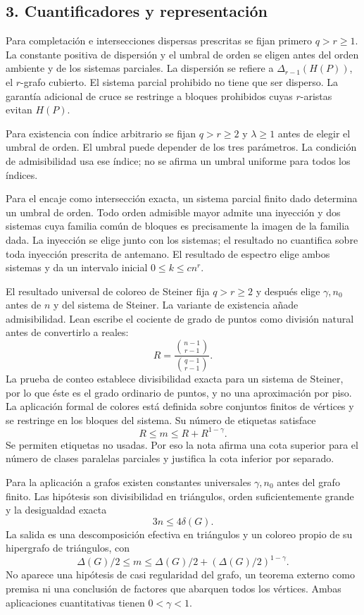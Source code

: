 \documentclass[spanish,11pt,a4paper]{article}
\begin{document}
\subsection{3. Cuantificadores y representación}\label{cuantificadores-y-representaciuxf3n}

Para completación e intersecciones dispersas prescritas se fijan primero \(q>r\ge1\). La constante positiva de dispersión y el umbral de orden se eligen antes del orden ambiente y de los sistemas parciales. La dispersión se refiere a \(\Delta_{r-1}(H(P))\), el \(r\)-grafo cubierto. El sistema parcial prohibido no tiene que ser disperso. La garantía adicional de cruce se restringe a bloques prohibidos cuyas \(r\)-aristas evitan \(H(P)\).

Para existencia con índice arbitrario se fijan \(q>r\ge2\) y \(\lambda\ge1\) antes de elegir el umbral de orden. El umbral puede depender de los tres parámetros. La condición de admisibilidad usa ese índice; no se afirma un umbral uniforme para todos los índices.

Para el encaje como intersección exacta, un sistema parcial finito dado determina un umbral de orden. Todo orden admisible mayor admite una inyección y dos sistemas cuya familia común de bloques es precisamente la imagen de la familia dada. La inyección se elige junto con los sistemas; el resultado no cuantifica sobre toda inyección prescrita de antemano. El resultado de espectro elige ambos sistemas y da un intervalo inicial \(0\le k\le c n^r\).

El resultado universal de coloreo de Steiner fija \(q>r\ge2\) y después elige \(\gamma,n_0\) antes de \(n\) y del sistema de Steiner. La variante de existencia añade admisibilidad. Lean escribe el cociente de grado de puntos como división natural antes de convertirlo a reales: \[R=\frac{\binom{n-1}{r-1}}{\binom{q-1}{r-1}}.\] La prueba de conteo establece divisibilidad exacta para un sistema de Steiner, por lo que éste es el grado ordinario de puntos, y no una aproximación por piso. La aplicación formal de colores está definida sobre conjuntos finitos de vértices y se restringe en los bloques del sistema. Su número de etiquetas satisface \[R\le m\le R+R^{1-\gamma}.\] Se permiten etiquetas no usadas. Por eso la nota afirma una cota superior para el número de clases paralelas parciales y justifica la cota inferior por separado.

Para la aplicación a grafos existen constantes universales \(\gamma,n_0\) antes del grafo finito. Las hipótesis son divisibilidad en triángulos, orden suficientemente grande y la desigualdad exacta \[3n\le4\delta(G).\] La salida es una descomposición efectiva en triángulos y un coloreo propio de su hipergrafo de triángulos, con \[\Delta(G)/2\le m
\le\Delta(G)/2+(\Delta(G)/2)^{1-\gamma}.\] No aparece una hipótesis de casi regularidad del grafo, un teorema externo como premisa ni una conclusión de factores que abarquen todos los vértices. Ambas aplicaciones cuantitativas tienen \(0<\gamma<1\).
\end{document}
